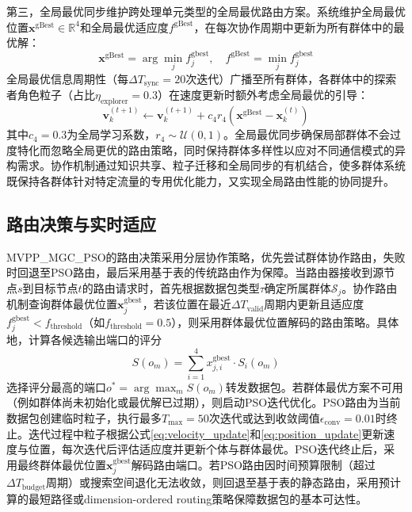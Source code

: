 第三，全局最优同步维护跨处理单元类型的全局最优路由方案。系统维护全局最优位置$\mathbf{x}^{\text{gBest}} \in \mathbb{R}^4$和全局最优适应度$f^{\text{gBest}}$，在每次协作周期中更新为所有群体中的最优解：
\begin{equation}
\mathbf{x}^{\text{gBest}} = \arg\min_{j} f_j^{\text{gbest}}, \quad f^{\text{gBest}} = \min_{j} f_j^{\text{gbest}}
\end{equation}
全局最优信息周期性（每$\Delta T_{\text{sync}} = 20$次迭代）广播至所有群体，各群体中的探索者角色粒子（占比$\eta_{\text{explorer}} = 0.3$）在速度更新时额外考虑全局最优的引导：
\begin{equation}
\mathbf{v}_k^{(t+1)} \leftarrow \mathbf{v}_k^{(t+1)} + c_4 r_4 (\mathbf{x}^{\text{gBest}} - \mathbf{x}_k^{(t)})
\end{equation}
其中$c_4 = 0.3$为全局学习系数，$r_4 \sim \mathcal{U}(0, 1)$。全局最优同步确保局部群体不会过度特化而忽略全局更优的路由策略，同时保持群体多样性以应对不同通信模式的异构需求。协作机制通过知识共享、粒子迁移和全局同步的有机结合，使多群体系统既保持各群体针对特定流量的专用优化能力，又实现全局路由性能的协同提升。

\subsection{路由决策与实时适应}

MVPP\_MGC\_PSO的路由决策采用分层协作策略，优先尝试群体协作路由，失败时回退至PSO路由，最后采用基于表的传统路由作为保障。当路由器接收到源节点$s$到目标节点$t$的路由请求时，首先根据数据包类型$\tau$确定所属群体$\mathcal{S}_j$。协作路由机制查询群体最优位置$\mathbf{x}_j^{\text{gbest}}$，若该位置在最近$\Delta T_{\text{valid}}$周期内更新且适应度$f_j^{\text{gbest}} < f_{\text{threshold}}$（如$f_{\text{threshold}} = 0.5$），则采用群体最优位置解码的路由策略。具体地，计算各候选输出端口的评分
\begin{equation}
S(o_m) = \sum_{i=1}^4 x_{j,i}^{\text{gbest}} \cdot S_i(o_m)
\end{equation}
选择评分最高的端口$o^* = \arg\max_m S(o_m)$转发数据包。若群体最优方案不可用（例如群体尚未初始化或最优解已过期），则启动PSO迭代优化。PSO路由为当前数据包创建临时粒子，执行最多$T_{\max} = 50$次迭代或达到收敛阈值$\epsilon_{\text{conv}} = 0.01$时终止。迭代过程中粒子根据公式\eqref{eq:velocity_update}和\eqref{eq:position_update}更新速度与位置，每次迭代后评估适应度并更新个体与群体最优。PSO迭代终止后，采用最终群体最优位置$\mathbf{x}_j^{\text{gbest}}$解码路由端口。若PSO路由因时间预算限制（超过$\Delta T_{\text{budget}}$周期）或搜索空间退化无法收敛，则回退至基于表的静态路由，采用预计算的最短路径或dimension-ordered routing策略保障数据包的基本可达性。

